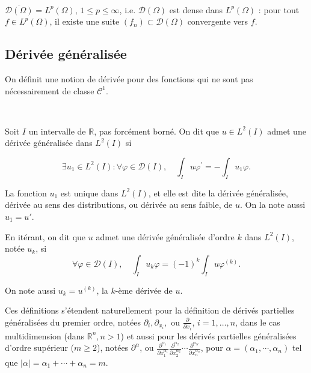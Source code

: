 \begin{theorem}\
	
$\overline{\mathcal{D}(\Omega)}=L^{p}(\Omega)$, $1\leq p\leq \infty$,  i.e. $\mathcal{D}(\Omega)$ est dense dans $L^{p}(\Omega)$ : pour tout $f\in L^{p}(\Omega)$, il existe une suite $(f_n)\subset \mathcal{D}(\Omega)$ convergente vers $f$.
\end{theorem}


\subsection{Dérivée généralisée}
On définit une notion de dérivée pour des fonctions qui ne sont pas  nécessairement de classe $\mathcal{C}^{1}$. 

\begin{definition}\ 
	
Soit $I$ un intervalle de $\mathbb{R}$, pas forcément borné. On dit que $u \in L^{2}(I)$ admet une dérivée généralisée dans $L^{2}(I)$ si 
 
 $$\exists u_{1} \in L^{2}(I) :  \forall \varphi \in \mathcal{D}(I), \quad \int_{I} u \varphi^{\prime}=-\int_{I} u_{1} \varphi .
 $$ 
 
La fonction $u_1$ est unique dans  $ L^{2}(I)$, et elle est dite la dérivée généralisée, dérivée au sens des distributions, ou dérivée au sens faible, de $u$. On la note aussi $u_1=u'$.
 
 En itérant, on dit que $u$ admet une dérivée généralisée d'ordre $k$ dans
 $L^{2}(I)$, notée $u_{k}$, si $$\forall \varphi \in \mathcal{D}(I), \quad \int_{I} u_{k} \varphi=(-1)^{k} \int_{I} u \varphi^{(k)}.
 $$
 
 On note aussi $u_k=u^{(k)}$, la $k$-ème dérivée de $u$. 
 
 Ces définitions s'étendent naturellement pour la définition de dérivés partielles généralisées du premier ordre, notées $\partial_{i}, \partial_{x_i}, $ ou $\frac{\partial}{\partial x_i}$, $ i=1, \dots, n$,  dans le cas multidimension (dans $\mathbb{R}^n, n>1$) et aussi pour les dérivés partielles généralisées d'ordre supérieur ($m\geq 2$), notées $\partial^\alpha$, ou $\frac{\partial^{\alpha_{1}}}{\partial x_{1}^{\alpha_{1}}} \frac{\partial^{\alpha_{2}}}{\partial x_{2}^{\alpha_{2}}} \cdots \frac{\partial^{\alpha_{N}}}{\partial x_{n}^{\alpha_{n}}}$, pour $\alpha =(\alpha_1, \cdots, \alpha_n)$ tel que $|\alpha|=\alpha_{1}+\cdots+\alpha_{n} =m$. 
 
\end{definition}

